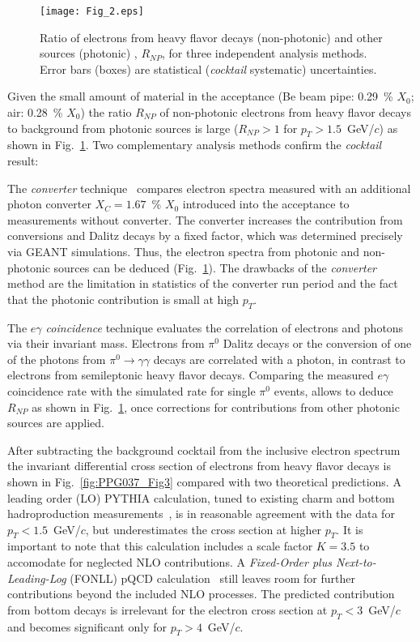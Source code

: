 \documentclass[aps,prl,superscriptaddress,showpacs,floatfix,twocolumn]{revtex4}
\begin{document}
\begin{figure}[t]
\texttt{[image: Fig\_2.eps]}
\caption {\label{fig:PPG037_Fig2} Ratio of electrons from heavy flavor decays 
(non-photonic) and other sources (photonic) , $R_{NP}$, for three 
independent analysis methods. Error bars (boxes) are statistical 
({\it cocktail} systematic) uncertainties.}
\end{figure}

Given the small amount of material in the acceptance 
(Be beam pipe: 0.29~\% $X_0$; air: 0.28~\% $X_0$) the ratio $R_{NP}$ of 
non-photonic electrons from heavy flavor decays to background from photonic 
sources is large ($R_{NP} > 1$ for $p_T > 1.5$~GeV/$c$) as shown in
Fig.~\ref{fig:PPG037_Fig2}.
Two complementary analysis methods confirm the {\it cocktail} result:

The {\it converter} technique~\cite{phenix_auau200} compares 
electron spectra measured with an additional photon converter 
$X_{C} = 1.67$~\% $X_0$ introduced into the acceptance to measurements 
without converter. 
The converter increases the contribution from conversions and Dalitz 
decays by a fixed factor, which was determined precisely via GEANT 
simulations. 
Thus, the electron spectra from photonic and non-photonic sources can be 
deduced (Fig.~\ref{fig:PPG037_Fig2}). 
The drawbacks of the {\it converter} method are the limitation in statistics 
of the converter run period and the fact that the photonic contribution is 
small at high $p_T$.

The {\it $e\gamma$ coincidence} technique evaluates the correlation of
electrons and photons via their invariant mass. 
Electrons from $\pi^0$ Dalitz decays or the conversion of one of the photons
from $\pi^0 \rightarrow \gamma\gamma$ decays are correlated with a photon, in 
contrast to electrons from semileptonic heavy flavor decays.
Comparing the measured $e\gamma$ coincidence rate with the simulated rate
for single $\pi^0$ events, allows to deduce $R_{NP}$ as shown in 
Fig.~\ref{fig:PPG037_Fig2}, once corrections for contributions from other 
photonic sources are applied. 

After subtracting the background cocktail from the inclusive electron 
spectrum the invariant differential cross section of electrons from 
heavy flavor decays is shown in Fig.~\ref{fig:PPG037_Fig3} compared with 
two theoretical predictions. 
A leading order (LO) PYTHIA calculation, tuned to existing charm and bottom 
hadroproduction measurements~\cite{pythia_tuned}, is in reasonable agreement 
with the data for $p_T < 1.5$~GeV/$c$, but underestimates the cross section 
at higher $p_T$. 
It is important to note that this calculation includes a scale factor $K = 3.5$
to accomodate for neglected NLO contributions. 
A {\it Fixed-Order plus Next-to-Leading-Log} (FONLL) pQCD 
calculation~\cite{cacciari05} still leaves room for further contributions 
beyond the included NLO processes.
The predicted contribution from bottom decays is irrelevant for the
electron cross section at $p_T < 3$~GeV/$c$ and becomes significant only for 
$p_T > 4$~GeV/$c$.
\end{document}
